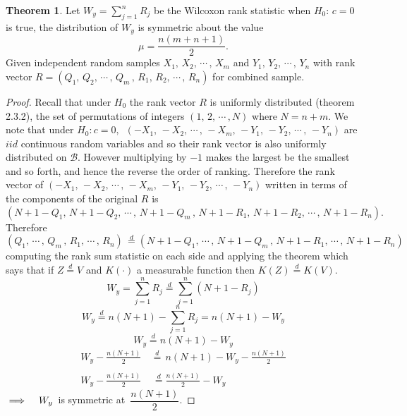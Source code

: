 \documentclass[12pt,a4paper]{report}
\theoremstyle{definition}
\newtheorem{thm}{Theorem}[section]
\theoremstyle{plain}
\begin{document}
\begin{thm}
Let $W_y = \sum^n_{j = 1} R_j$ be the Wilcoxon rank statistic when $H_0:\, c = 0$ is true, the distribution of $W_y$ is symmetric about the value $$\mu = \frac{n(m + n + 1)}{2}.$$ Given independent random samples $X_1, \, X_2, \, \cdots\, ,\, X_m$ and $Y_1, \, Y_2, \, \cdots\, ,\, Y_n$ with rank vector $R = \left(Q_1, \, Q_2, \, \cdots\, , \, Q_m\, , \, R_1, \, R_2,\, \cdots\, , \, R_n\right)$ for combined sample.
\end{thm}


\begin{proof}
Recall that under $H_0$ the rank vector $R$ is uniformly distributed (theorem 2.3.2), the set of permutations of integers $(1,\, 2, \, \cdots\, , N)$ where $N= n + m$. We note that under $H_0: c = 0,$   $\, \left(-X_1, \,-X_2, \, \cdots\, , \, -X_m, \, -Y_1, \, -Y_2, \, \cdots\, , \, -Y_n\right)$ are $iid$ continuous random variables and so their rank vector is also uniformly distributed on $\mathcal{B}$. However multiplying by $-1$ makes the largest be the smallest and so forth, and hence the reverse the order of ranking. Therefore the rank vector of $\left(-X_1, \,-X_2, \, \cdots\, , \, -X_m, \, -Y_1, \, -Y_2, \, \cdots\, , \, -Y_n\right)$ written in terms of the components of the original $R$ is $$\left(N + 1 - Q_1, \, N + 1 - Q_2, \, \cdots\, , \, N + 1 - Q_m\, , \, N + 1 - R_1, \, N + 1 - R_2,\, \cdots\, , \, N + 1 - R_n\right).$$ Therefore
$$
\left(Q_1,\, \cdots\, , \, Q_m\, , \, R_1,\, \cdots\, , \, R_n\right) \, \overset{d}{=}\left(N + 1 - Q_1, \, \cdots\, , \, N + 1 -Q_m\, , \, N + 1 - R_1, \, \cdots\, , \,N + 1 -  R_n\right)$$
computing the rank sum statistic on each side and applying the theorem which says that  if $Z\overset{d}{=}V$ and $K(\cdot)$ a measurable function then $K(Z) \overset{d}{=} K(V)$. $$W_y = \sum^n_{j = 1} R_j \overset{d}{=} \sum^n_{j = 1} (N + 1 - R_j)$$
$$W_y \overset{d}{=} n(N+ 1) - \sum^n_{j = 1} R_j = n(N + 1) - W_y$$
$$W_y \overset{d}{=} n(N+1) - W_y$$
\begin{align*}
W_y - \frac{n(N+1)}{2}\, & \overset{d}{=}\, n(N+1)- W_y - \frac{n(N+1)}{2}\\\\
W_y - \frac{n(N+1)}{2}\, & \,\overset{d}{=} \frac{n(N+1)}{2} - W_y
\end{align*}
$\implies\hspace{0.3cm} W_y\,$ is symmetric at $\, \dfrac{n (N + 1)}{2}$.
\end{proof}
\end{document}
